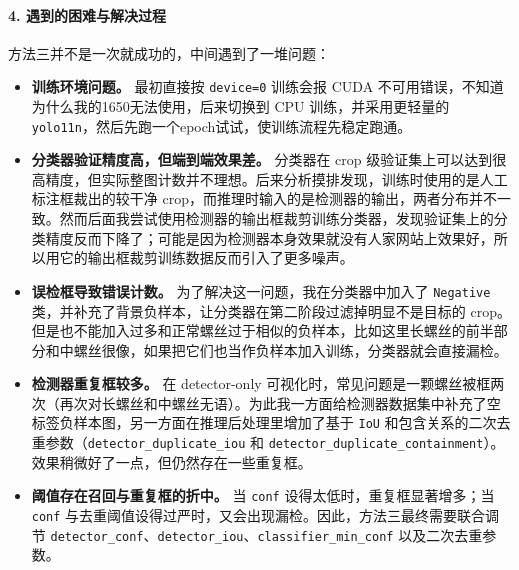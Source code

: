 \documentclass[12pt,a4paper]{ctexart}
\begin{document}
\paragraph{4. 遇到的困难与解决过程}
方法三并不是一次就成功的，中间遇到了一堆问题：
\begin{itemize}
    \item \textbf{训练环境问题。} 最初直接按 \texttt{device=0} 训练会报 CUDA 不可用错误，不知道为什么我的1650无法使用，后来切换到 CPU 训练，并采用更轻量的 \texttt{yolo11n}，然后先跑一个epoch试试，使训练流程先稳定跑通。
    \item \textbf{分类器验证精度高，但端到端效果差。} 分类器在 crop 级验证集上可以达到很高精度，但实际整图计数并不理想。后来分析摸排发现，训练时使用的是人工标注框裁出的较干净 crop，而推理时输入的是检测器的输出，两者分布并不一致。然而后面我尝试使用检测器的输出框裁剪训练分类器，发现验证集上的分类精度反而下降了；可能是因为检测器本身效果就没有人家网站上效果好，所以用它的输出框裁剪训练数据反而引入了更多噪声。
    \item \textbf{误检框导致错误计数。} 为了解决这一问题，我在分类器中加入了 \texttt{Negative} 类，并补充了背景负样本，让分类器在第二阶段过滤掉明显不是目标的 crop。但是也不能加入过多和正常螺丝过于相似的负样本，比如这里长螺丝的前半部分和中螺丝很像，如果把它们也当作负样本加入训练，分类器就会直接漏检。
    \item \textbf{检测器重复框较多。} 在 detector-only 可视化时，常见问题是一颗螺丝被框两次（再次对长螺丝和中螺丝无语）。为此我一方面给检测器数据集中补充了空标签负样本图，另一方面在推理后处理里增加了基于 \texttt{IoU} 和包含关系的二次去重参数（\texttt{detector\_duplicate\_iou} 和 \texttt{detector\_duplicate\_containment}）。效果稍微好了一点，但仍然存在一些重复框。
    \item \textbf{阈值存在召回与重复框的折中。} 当 \texttt{conf} 设得太低时，重复框显著增多；当 \texttt{conf} 与去重阈值设得过严时，又会出现漏检。因此，方法三最终需要联合调节 \texttt{detector\_conf}、\texttt{detector\_iou}、\texttt{classifier\_min\_conf} 以及二次去重参数。
\end{itemize}
\end{document}

